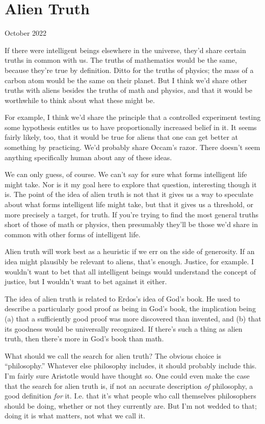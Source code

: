 \chapter{Alien Truth}

October 2022

If there were intelligent beings elsewhere in the universe, they'd share
certain truths in common with us. The truths of mathematics would be the
same, because they're true by definition. Ditto for the truths of
physics; the mass of a carbon atom would be the same on their planet.
But I think we'd share other truths with aliens besides the truths of
math and physics, and that it would be worthwhile to think about what
these might be.

For example, I think we'd share the principle that a controlled
experiment testing some hypothesis entitles us to have proportionally
increased belief in it. It seems fairly likely, too, that it would be
true for aliens that one can get better at something by practicing. We'd
probably share Occam's razor. There doesn't seem anything specifically
human about any of these ideas.

We can only guess, of course. We can't say for sure what forms
intelligent life might take. Nor is it my goal here to explore that
question, interesting though it is. The point of the idea of alien truth
is not that it gives us a way to speculate about what forms intelligent
life might take, but that it gives us a threshold, or more precisely a
target, for truth. If you're trying to find the most general truths
short of those of math or physics, then presumably they'll be those we'd
share in common with other forms of intelligent life.

Alien truth will work best as a heuristic if we err on the side of
generosity. If an idea might plausibly be relevant to aliens, that's
enough. Justice, for example. I wouldn't want to bet that all
intelligent beings would understand the concept of justice, but I
wouldn't want to bet against it either.

The idea of alien truth is related to Erdos's idea of God's book. He
used to describe a particularly good proof as being in God's book, the
implication being (a) that a sufficiently good proof was more discovered
than invented, and (b) that its goodness would be universally
recognized. If there's such a thing as alien truth, then there's more in
God's book than math.

What should we call the search for alien truth? The obvious choice is
``philosophy.'' Whatever else philosophy includes, it should probably
include this. I'm fairly sure Aristotle would have thought so. One could
even make the case that the search for alien truth is, if not an
accurate description \emph{of} philosophy, a good definition \emph{for}
it. I.e. that it's what people who call themselves philosophers should
be doing, whether or not they currently are. But I'm not wedded to that;
doing it is what matters, not what we call it.

